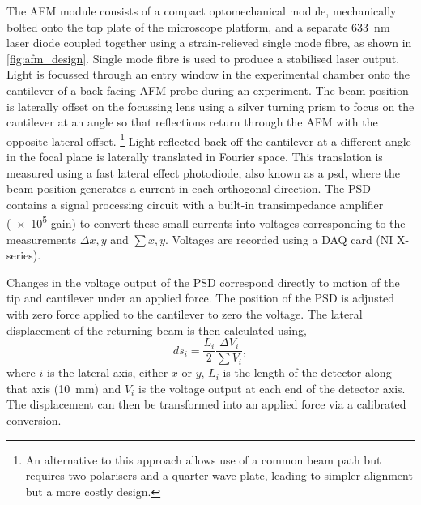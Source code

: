 \documentclass{article}
\begin{document}
The AFM module consists of a compact optomechanical module, mechanically bolted onto the top plate of the microscope platform, and a separate \SI{633}{nm} laser diode coupled together using a strain-relieved single mode fibre, as shown in \autoref{fig:afm_design}. Single mode fibre is used to produce a stabilised laser output.
Light is focussed through an entry window in the experimental chamber onto the cantilever of a back-facing AFM probe during an experiment. The beam position is laterally offset on the focussing lens using a silver turning prism to focus on the cantilever at an angle so that reflections return through the AFM with the opposite lateral offset.%
\footnote{An alternative to this approach allows use of a common beam path but requires two polarisers and a quarter wave plate, leading to simpler alignment but a more costly design.}
Light reflected back off the cantilever at a different angle in the focal plane is laterally translated in Fourier space. This translation is measured using a fast lateral effect photodiode, also known as a \gls{psd}, where the beam position generates a current in each orthogonal direction. The PSD contains a signal processing circuit with a built-in transimpedance amplifier (\num{e5} gain) to convert these small currents into voltages corresponding to the measurements $\Delta x,y$ and $\sum x,y$. Voltages are recorded using a DAQ card (NI X-series).

Changes in the voltage output of the PSD correspond directly to motion of the tip and cantilever under an applied force. The position of the PSD is adjusted with zero force applied to the cantilever to zero the voltage. The lateral displacement of the returning beam is then calculated using,
\begin{equation}
ds_i = \frac{L_i}{2}\frac{\Delta V_i}{\sum V_i},
\end{equation}
where $i$ is the lateral axis, either $x$ or $y$, $L_i$ is the length of the detector along that axis (\SI{10}{mm}) and $V_i$ is the voltage output at each end of the detector axis. The displacement can then be transformed into an applied force via a calibrated conversion.
\end{document}
